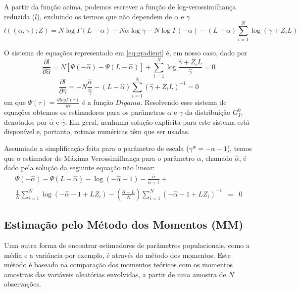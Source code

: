 \documentclass[12pt]{article}
\begin{document}
A partir da função acima, podemos escrever a função de log-verossimilhança reduzida ($l$), excluindo os termos que não dependem de $\alpha$ e $\gamma$
\begin{equation}
    l((\alpha, \gamma); Z) = N\log\Gamma(L-\alpha) - N\alpha \log\gamma - N\log\Gamma(-\alpha) - (L-\alpha)\sum_{i=1}^{N}\log(\gamma +Z_iL) \label{eq:logVerRed}
\end{equation}

O sistema de equações representado em \eqref{eq:gradient} é, em nosso caso, dado por
\begin{equation}
  \frac{\partial l}{\partial \widehat{\alpha}} = N[\Psi(-\widehat{\alpha}) - \Psi(L-\widehat{\alpha})] + \sum_{i=1}^{N}\log\frac{\widehat{\gamma} + Z_iL}{\widehat{\gamma}} = 0
\end{equation}
\begin{equation}
   \frac{\partial l}{\partial \widehat{\gamma}} = -N\frac{\widehat{\alpha}}{\widehat{\gamma}} - (L - \widehat{\alpha})\sum_{i=1}^{N}(\widehat{\gamma} + Z_iL)^{-1} = 0
\end{equation}
em que $\Psi(\tau) = \frac{\textit{d}log\Gamma(\tau)}{\textit{d}\tau}$ é a função $Digama$. Resolvendo esse sistema de equações obtemos os estimadores para os parâmetros $\alpha$ e $\gamma$ da distribuição $G_I^0$, denotados por $\widehat{\alpha}$ e $\widehat{\gamma}$. Em geral, nenhuma solução explícita para este sistema está disponível e, portanto, rotinas numéricas têm que ser usadas.

Assumindo a simplificação feita para o parâmetro de escala ($\gamma* = -\alpha - 1$), temos que o estimador de Máxima Verossimilhança para o parâmetro $\alpha$, chamado $\widehat{\alpha}$, é dado pela solução da seguinte equação não linear:
\begin{eqnarray}
    \Psi(-\widehat{\alpha}) - \Psi(L-\widehat{\alpha}) - \log(-\widehat{\alpha}-1) - \frac{\widehat{\alpha}}{\widehat{\alpha}+1} + \nonumber \\ \frac{1}{N}\sum_{i=1}^{N}\log(-\widehat{\alpha} - 1 + LZ_i) - \left ( \frac{\widehat{\alpha}-L}{N} \right )\sum_{i=1}^{N}(-\widehat{\alpha} - 1 + LZ_i)^{-1} & = & 0
\end{eqnarray}

\subsection{Estimação pelo Método dos Momentos (MM)}

Uma outra forma de encontrar estimadores de parâmetros populacionais, como a média e a variância por exemplo, é através do método dos momentos. Este método é baseado na comparação dos momentos teóricos com os momentos amostrais das variáveis aleatórias envolvidas, a partir de uma amostra de $N$ observações.
\end{document}

